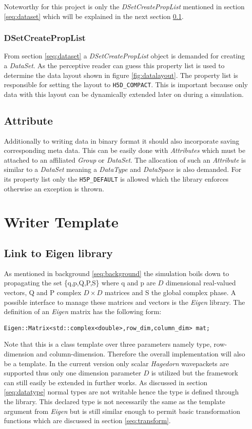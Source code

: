 Noteworthy for this project is only the \textit{DSetCreatePropList} mentioned in section \ref{seq:dataset} which will be explained in the next section \ref{seq:dscpl}.

\subsection{DSetCreatePropList}
\label{seq:dscpl}
From section \ref{seq:dataset} a \textit{DSetCreatePropList} object is demanded for creating a \textit{DataSet}. As the perceptive reader can guess this property list is used to determine the data layout shown in figure \ref{fig:datalayout}. The property list is responsible for setting the layout to \texttt{H5D\_COMPACT}. This is important because only data with this layout can be dynamically extended later on during a simulation. 

\section{Attribute}
Additionally to writing data in binary format it should also incorporate saving corresponding meta data. This can be easily done with \textit{Attributes} which must be attached to an affiliated \textit{Group} or \textit{DataSet}. The allocation of such an \textit{Attribute} is similar to a \textit{DataSet} meaning a \textit{DataType} and \textit{DataSpace} is also demanded. For its property list only the \texttt{H5P\_DEFAULT} is allowed which the library enforces otherwise an exception is thrown.

\chapter{Writer Template}
\section{Link to Eigen library}
\label{seq:linkeigen}
As mentioned in background \ref{seq:background} the simulation boils down to propagating the set \{q,p,Q,P,S\} where q and p are $D$ dimensional real-valued vectors, Q and P complex $D \times D$ matrices and S the global complex phase. A possible interface to manage these matrices and vectors is the \textit{Eigen} library. The definition of an \textit{Eigen} matrix has the following form:
\begin{lstlisting}
Eigen::Matrix<std::complex<double>,row_dim,column_dim> mat;
\end{lstlisting}
Note that this is a class template over three parameters namely type, row-dimension and column-dimension. Therefore the overall implementation will also be a template. In the current version only scalar \textit{Hagedorn} wavepackets are supported thus only one dimension parameter $D$ is utilized but the framework can still easily be extended in further works. As discussed in section \ref{seq:datatype} normal types are not writable hence the type is defined through the library. This declared type is not necessarily the same as the template argument from \textit{Eigen} but is still similar enough to permit basic transformation functions which are discussed in section \ref{seq:transform}.


